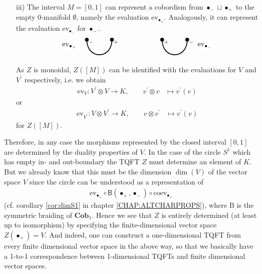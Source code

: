 \begin{enumerate}
\item[iii)]
The interval $M = [0,1]$ can represent a cobordism from $\bullet_{-} \sqcup \bullet_{+}$ to the empty 0-manifold $\emptyset$, namely the evaluation $\mathrm{ev}_{\bullet_{+}}$. Analogously, it can represent the evaluation $\mathrm{ev}_{\bullet_{-}}$ for $\bullet_{-}$.
\begin{equation*}
\begin{tikzpicture}[scale=1.25,very thick]
  \filldraw
    (0,0) circle (1.7pt) node[shift={(0.2,-0.12)}] {\scriptsize{$-$}}
    (1,0) circle (1.7pt) node[shift={(0.2,-0.12)}] {\scriptsize{$+$}};
  \draw
    (0,0)
    ..
    controls
    +(0,-0.8)
    and
    +(0,-0.8)
    ..
    (1,0);
  \filldraw
    (3,0) circle (1.7pt) node[shift={(0.2,-0.12)}] {\scriptsize{$+$}}
    (4,0) circle (1.7pt) node[shift={(0.2,-0.12)}] {\scriptsize{$-$}};
  \draw
    (3,0)
    ..
    controls
    +(0,-0.8)
    and
    +(0,-0.8)
    ..
    (4,0);
  \draw
    (-0.7,-0.25) node[fill=white] {$\mathrm{ev}_{\bullet_{+}}$}
    (4.7,-0.25) node[fill=white] {$\mathrm{ev}_{\bullet_{-}}$};
\end{tikzpicture}
\end{equation*}
As $Z$ is monoidal, $Z([M])$ can be identified with the evaluations for $V$ and $V^{\prime}$ respectively, i.e. we obtain
\begin{align*}
  \mathrm{ev}_{V}
  \colon
  V^{\prime}
  \otimes
  V
  \to
  K
  ,\qquad
  v^{\prime}
  \otimes
  v
  &\mapsto
  v^{\prime}(v)
\end{align*}
or
\begin{align*}
  \mathrm{ev}_{V^{\prime}}
  \colon
  V
  \otimes
  V^{\prime}
  \to
  K
  ,\qquad
  v
  \otimes
  v^{\prime}
  &\mapsto
  v^{\prime}(v)
\end{align*}
for $Z([M])$.
\end{enumerate}
Therefore, in any case the morphisms represented by the closed interval $[0,1]$ are determined by the duality properties of $V$. In the case of the circle $S^{1}$ which has empty in- and out-boundary the TQFT $Z$ must determine an element of $K$. But we already know that this must be the dimension $\dim(V)$ of the vector space $V$ since the circle can be understood as a representation of
\begin{align*}
  \mathrm{ev}_{\bullet_{+}}
  \circ
  \mathsf{B}
  \left(
    \bullet_{+}
    ,
    \bullet_{-}
  \right)
  \circ
  \mathrm{coev}_{\bullet_{+}}
\end{align*}
(cf. corollary \ref{cor:dimS1} in chapter \ref{CHAP:ALTCHARPROPS}), where $\mathrm{B}$ is the symmetric braiding of $\mathbf{Cob}_{1}$. Hence we see that $Z$ is entirely determined (at least up to isomorphism) by specifying the finite-dimensional vector space $Z(\bullet_{+}) = V$. And indeed, one can construct a one-dimensional TQFT from every finite dimensional vector space in the above way, so that we basically have a 1-to-1 correspondence between 1-dimensional TQFTs and finite dimensional vector spaces.
